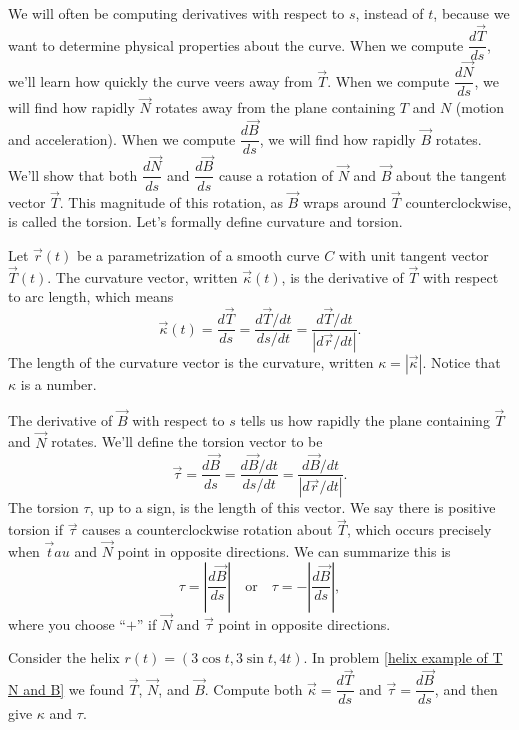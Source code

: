 We will often be computing derivatives with respect to $s$, instead of $t$, because we want to determine physical properties about the curve. When we compute $\dfrac{d\vec T}{ds}$, we'll learn how quickly the curve veers away from $\vec T$.  
When we compute $\dfrac{d\vec N}{ds}$, we will find how rapidly $\vec N$ rotates away from the plane containing $T$ and $N$ (motion and acceleration). 
When we compute $\dfrac{d\vec B}{ds}$, we will find how rapidly $\vec B$ rotates.  We'll show that both $\dfrac{d\vec N}{ds}$ and $\dfrac{d\vec B}{ds}$ cause a rotation of $\vec N$ and $\vec B$ about the tangent vector $\vec T$. This magnitude of this rotation, as $\vec B$ wraps around $\vec T$ counterclockwise, is called the torsion. Let's formally define curvature and torsion.

\begin{definition}
 Let $\vec r(t)$ be a parametrization of a smooth curve $C$ with unit tangent vector $\vec T(t)$.  The curvature vector, written $\vec \kappa(t)$, is the derivative of $\vec T$ with respect to arc length, which means 
 $$\vec \kappa(t)=\dfrac{d\vec T}{ds}=\dfrac{d\vec T/dt}{ds/dt}=\dfrac{d\vec T/dt}{|d\vec r/dt|}.$$ 
 The length of the curvature vector is the curvature, written $\kappa = |\vec\kappa|$. Notice that $\kappa$ is a number.

 The derivative of $\vec B$ with respect to $s$ tells us how rapidly the plane containing $\vec T$ and $\vec N$ rotates. We'll define the torsion vector to be 
 $$\vec \tau = \dfrac{d\vec B}{ds} = \dfrac{d\vec B/dt}{ds/dt}=\dfrac{d\vec B/dt}{|d\vec r/dt|}.$$ 
 The torsion $\tau$, up to a sign, is the length of this vector. We say there is positive torsion if $\vec \tau$ causes a counterclockwise rotation about $\vec T$, which occurs precisely when $\vec tau$ and $\vec N$ point in opposite directions. We can summarize this is $$\tau=\left|\dfrac{d\vec B}{ds}\right|\quad \text{or}\quad \tau=-\left|\dfrac{d\vec B}{ds}\right|,$$ where you choose ``$+$'' if $\vec N$ and $\vec \tau$ point in opposite directions. 
\end{definition}


\begin{problem}
 Consider the helix $r(t)=(3\cos t, 3\sin t, 4t)$. In problem \ref{helix example of T N and B} we found $\vec T$, $\vec N$, and $\vec B$. Compute both $\vec \kappa=\dfrac{d\vec T}{ds}$ and $\vec \tau=\dfrac{d\vec B}{ds}$, and then give $\kappa$ and $\tau$.
\end{problem}

